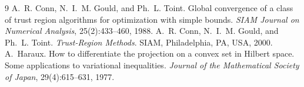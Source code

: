 \documentclass[11pt,a4paper]{article}
\numberwithin{equation}{section}
\theoremstyle{plain}
\theoremstyle{definition}
\theoremstyle{remark}
\begin{document}
\begin{thebibliography}{9}
 A.~R. Conn, N.~I.~M. Gould, and Ph.~L. Toint. Global convergence of a class of
  trust region algorithms for optimization with simple bounds. \emph{SIAM Journal on Numerical
  Analysis}, 25(2):433--460, 1988.
 A.~R. Conn, N.~I.~M. Gould, and Ph.~L. Toint. \emph{Trust-Region Methods}.
  SIAM, Philadelphia, PA, USA, 2000.
 A.~Haraux. How to differentiate the projection on a convex set in Hilbert
  space. Some applications to variational inequalities. \emph{Journal of the Mathematical
  Society of Japan}, 29(4):615--631, 1977.
\end{thebibliography}
\end{document}
